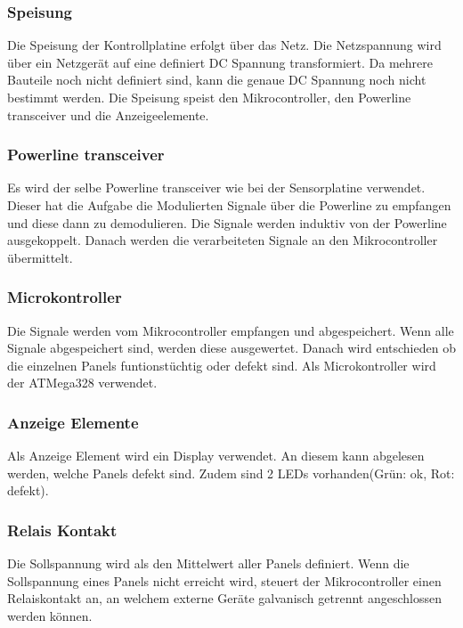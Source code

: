 \subsubsection{Speisung}
Die Speisung der Kontrollplatine erfolgt über das Netz. Die Netzspannung wird über ein Netzgerät auf eine definiert DC Spannung transformiert. 
Da mehrere Bauteile noch nicht definiert sind, kann die genaue DC Spannung noch nicht bestimmt werden. Die Speisung speist den Mikrocontroller, den Powerline transceiver und die Anzeigeelemente.

\subsubsection{Powerline transceiver}
Es wird der selbe Powerline transceiver wie bei der Sensorplatine verwendet. Dieser hat die Aufgabe die Modulierten Signale über die Powerline zu empfangen und diese dann zu demodulieren. Die Signale werden induktiv von der Powerline ausgekoppelt. Danach werden die verarbeiteten Signale an den Mikrocontroller übermittelt.

\subsubsection{Microkontroller}
Die Signale werden vom Mikrocontroller empfangen und abgespeichert. Wenn alle Signale abgespeichert sind, werden diese ausgewertet. Danach wird entschieden ob die einzelnen Panels funtionstüchtig oder defekt sind. Als Microkontroller wird der ATMega328 verwendet.

\subsubsection{Anzeige Elemente}
Als Anzeige Element wird ein Display verwendet. An diesem kann abgelesen werden, welche Panels defekt sind. Zudem sind 2 LEDs vorhanden(Grün: ok, Rot: defekt).

\subsubsection{Relais Kontakt}
Die Sollspannung wird als den Mittelwert aller Panels definiert.
Wenn die Sollspannung eines Panels nicht erreicht wird, steuert der Mikrocontroller einen Relaiskontakt an, an welchem externe Geräte galvanisch getrennt angeschlossen werden können.

%
